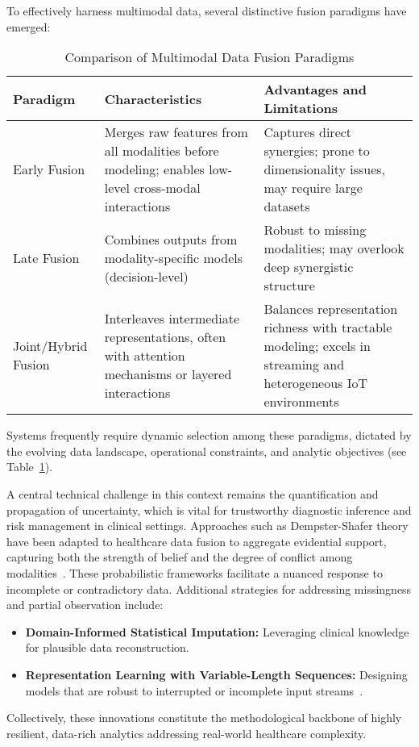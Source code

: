 \documentclass[11pt]{article}
\begin{document}
To effectively harness multimodal data, several distinctive fusion paradigms have emerged:
\begin{table}[ht]
    \centering
    \caption{Comparison of Multimodal Data Fusion Paradigms}
    \label{tab:fusion_paradigms}
    \begin{tabular}{|p{2.4cm}|p{4.2cm}|p{4.2cm}|}
    \hline
    \textbf{Paradigm} & \textbf{Characteristics} & \textbf{Advantages and Limitations} \\
    \hline
    Early Fusion & Merges raw features from all modalities before modeling; enables low-level cross-modal interactions & Captures direct synergies; prone to dimensionality issues, may require large datasets \\
    \hline
    Late Fusion & Combines outputs from modality-specific models (decision-level) & Robust to missing modalities; may overlook deep synergistic structure \\
    \hline
    Joint/Hybrid Fusion & Interleaves intermediate representations, often with attention mechanisms or layered interactions & Balances representation richness with tractable modeling; excels in streaming and heterogeneous IoT environments \\
    \hline
    \end{tabular}
\end{table}

Systems frequently require dynamic selection among these paradigms, dictated by the evolving data landscape, operational constraints, and analytic objectives (see Table~\ref{tab:fusion_paradigms}). 

A central technical challenge in this context remains the quantification and propagation of uncertainty, which is vital for trustworthy diagnostic inference and risk management in clinical settings. Approaches such as Dempster-Shafer theory have been adapted to healthcare data fusion to aggregate evidential support, capturing both the strength of belief and the degree of conflict among modalities~\cite{ref73}. These probabilistic frameworks facilitate a nuanced response to incomplete or contradictory data. Additional strategies for addressing missingness and partial observation include:
\begin{itemize}
    \item \textbf{Domain-Informed Statistical Imputation:} Leveraging clinical knowledge for plausible data reconstruction.
    \item \textbf{Representation Learning with Variable-Length Sequences:} Designing models that are robust to interrupted or incomplete input streams~\cite{ref76, ref77, ref84, ref89, ref90}.
\end{itemize}
Collectively, these innovations constitute the methodological backbone of highly resilient, data-rich analytics addressing real-world healthcare complexity.
\end{document}
